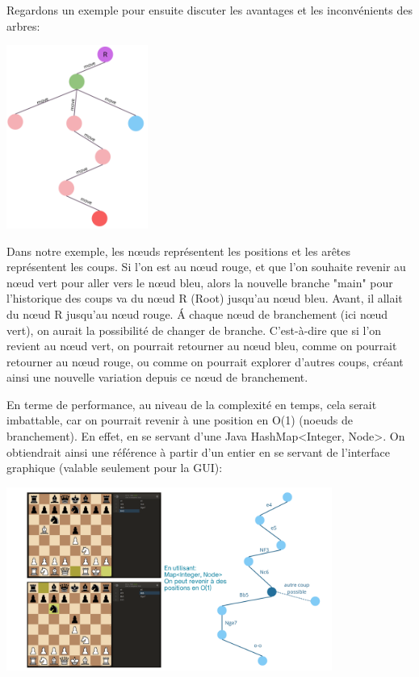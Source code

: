 \documentclass{article}
\begin{document}
Regardons un exemple pour ensuite discuter les avantages et les inconvénients des arbres:\\
\begin{center}
    \includegraphics[height=6.0cm]{arbres-branchement-coups.png}
\end{center}

Dans notre exemple, les nœuds représentent les positions
et les arêtes représentent les coups. Si l'on est au nœud rouge, et que l'on souhaite revenir au nœud vert pour aller vers le nœud bleu,
alors la nouvelle branche "main" pour l'historique des coups va du nœud R (Root) jusqu'au nœud bleu. Avant, il allait du nœud R jusqu'au
nœud rouge. \'A chaque nœud de branchement (ici nœud vert), on aurait la possibilité de changer de branche. C'est-à-dire que si l'on revient
au nœud vert, on pourrait retourner au nœud bleu, comme on pourrait retourner au nœud rouge, ou comme on pourrait explorer d'autres coups,
créant ainsi une nouvelle variation depuis ce nœud de branchement.

En terme de performance, au niveau de la complexité en temps, cela serait imbattable, car on pourrait revenir à une position en O(1) (noeuds de branchement).
En effet, en se servant d'une Java HashMap\textless Integer, Node\textgreater. On obtiendrait ainsi une référence à partir d'un entier en se servant de
l'interface graphique (valable seulement pour la GUI):\\
\begin{center}
    \includegraphics[height=6.0cm]{arbres-reprise-coups.png}
\end{center}
\end{document}
